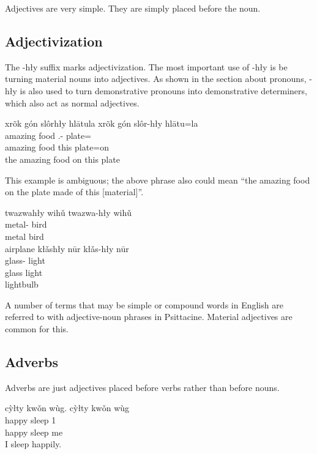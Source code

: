 Adjectives are very simple.
They are simply placed before the noun.

\subsection{Adjectivization}\label{subsec:adjectivization}
The -hły suffix marks adjectivization.
The most important use of -hły is be turning material nouns into adjectives.
As shown in the section about pronouns,
-hły is also used to turn demonstrative pronouns into demonstrative determiners,
which also act as normal adjectives.

\begin{exe}
    \ex
    \glt
    xrõk gón slôrhły hlātula
    \glll
    xrõk gón slôr-hły hlātu=la \\
    amazing food \Dem{}.\Prox{}-\Adj{} plate=\AdessThree{} \\
    amazing food this plate=on \\
    \glt
    the amazing food on this plate
\end{exe}
This example is ambiguous;
the above phrase also could mean
``the amazing food on the plate made of this [material]''.

\begin{exe}
    \ex
    \glt
    twazwahły wihǔ
    \glll
    twazwa-hły wihǔ \\
    metal-\Adj{} bird \\
    metal bird \\
    \glt
    airplane
    \ex
    \glt
    kłǎshły nūr
    \glll
    kłǎs-hły nūr \\
    glass-\Adj{} light \\
    glass light \\
    \glt
    lightbulb
\end{exe}

A number of terms that may be simple or compound words in English
are referred to with adjective-noun phrases in Psittacine.
Material adjectives are common for this.

\subsection{Adverbs}\label{subsec:adverbs}

Adverbs are just adjectives placed before verbs rather than before nouns.

\begin{exe}
    \ex
    \glt
    cỳłty kwǒn wùg.
    \glll
    cỳłty kwǒn wùg \\
    happy sleep 1\Sg{} \\
    happy sleep me \\
    \glt
    I sleep happily.
\end{exe}


